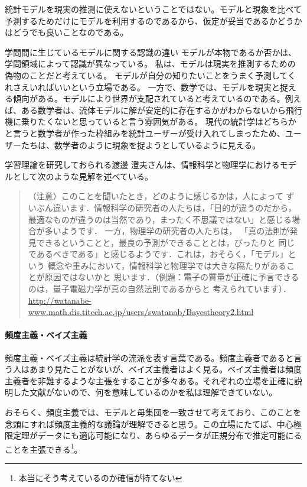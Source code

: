 統計モデルを現実の推測に使えないということではない。モデルと現象を比べて予測するためだけにモデルを利用するのであるから、仮定が妥当であるかどうかはどうでも良いことなのである。



\begin{SMbox}{学問間に生じているモデルに関する認識の違い}
モデルが本物であるか否かは、学問領域によって認識が異なっている。
私は、モデルは現実を推測するための偽物のことだと考えている。
モデルが自分の知りたいことをうまく予測してくれさえいればいいという立場である。
一方で、数学では、モデルを現実と捉える傾向がある。モデルにより世界が支配されていると考えているのである。例えば、ある数学者は、流体モデルに解が安定的に存在するかがわからないから飛行機に乗りたくないと思っていると言う雰囲気がある。
現代の統計学はどちらかと言うと数学者が作った枠組みを統計ユーザーが受け入れてしまったため、ユーザーたちは、数学者のように現象を捉ようとしているように見える。

学習理論を研究しておられる渡邊 澄夫さんは、情報科学と物理学におけるモデルとして次のような見解を述べている。
\begin{quote}
    （注意）このことを聞いたとき，どのように感じるかは，人によって ずいぶん違います．情報科学の研究者の人たちは，「目的が違うのだから， 最適なものが違うのは当然であり，まったく不思議ではない」と感じる場合が多いようです． 一方，物理学の研究者の人たちは， 「真の法則が発見できるということと，最良の予測ができることとは，ぴったりと 同じであるべきである」と感じるようです．これは，おそらく，「モデル」という 概念や重みにおいて，情報科学と物理学では大きな隔たりがあることが原因ではないかと 思います．（例題：電子の質量が正確に予言できるのは，量子電磁力学が真の自然法則であるからと 考えられています）．
    \\ \url{http://watanabe-www.math.dis.titech.ac.jp/users/swatanab/Bayestheory2.html}
\end{quote}

\end{SMbox}


\begin{mybox}
    \paragraph{頻度主義・ベイズ主義}
    頻度主義・ベイズ主義は統計学の流派を表す言葉である。頻度主義者であると言う人はあまり見たことがないが、ベイズ主義者はよく見る。ベイズ主義者は頻度主義者を非難するような主張をすることが多々ある。それぞれの立場を正確に説明した文献がないので、何を意味しているのかを私は理解できていない。

    おそらく、頻度主義では、モデルと母集団を一致させて考えており、このことを念頭にすれば頻度主義的な議論が理解できると思う。この立場にたてば、中心極限定理がデータにも適応可能になり、あらゆるデータが正規分布で推定可能にることを主張できる\footnote{本当にそう考えているのか確信が持てない}。
\end{mybox}
\fi


